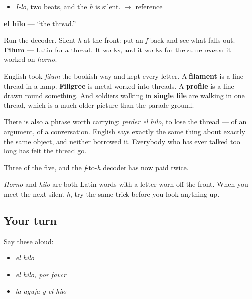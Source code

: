 \begin{sounds}
\begin{itemize}
\raggedright
  \item \emph{I-lo}, two beats, and the \emph{h} is silent. $\to$ reference
\end{itemize}
\end{sounds}

\begin{cousinweb}
\textbf{el hilo} — \textquotedblleft{}the thread.\textquotedblright{}

Run the decoder. Silent \emph{h} at the front: put an \emph{f} back and see what falls out. \textbf{Filum} — Latin for a thread. It works, and it works for the same reason it worked on \emph{horno}.

English took \emph{filum} the bookish way and kept every letter. A \textbf{filament} is a fine thread in a lamp. \textbf{Filigree} is metal worked into threads. A \textbf{profile} is a line drawn round something. And soldiers walking in \textbf{single file} are walking in one thread, which is a much older picture than the parade ground.

There is also a phrase worth carrying: \emph{perder el hilo}, to lose the thread — of an argument, of a conversation. English says exactly the same thing about exactly the same object, and neither borrowed it. Everybody who has ever talked too long has felt the thread go.
\end{cousinweb}

\begin{grammarlens}[title={What you've built}]
Three of the five, and the \emph{f}-to-\emph{h} decoder has now paid twice.

\emph{Horno} and \emph{hilo} are both Latin words with a letter worn off the front. When you meet the next silent \emph{h}, try the same trick before you look anything up.
\end{grammarlens}

\subsection*{Your turn}
Say these aloud:

\begin{itemize}
\raggedright
  \item \emph{el hilo}
  \item \emph{el hilo, por favor}
  \item \emph{la aguja y el hilo}
\end{itemize}

